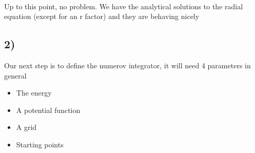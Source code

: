 \documentclass[10pt]{article}
\providecommand{\tightlist}{%
      \setlength{\itemsep}{0pt}\setlength{\parskip}{0pt}}
\begin{document}
    \begin{center}
    \end{center}
    { \hspace*{\fill} \\}

    Up to this point, no problem. We have the analytical solutions to the
radial equation (except for an r factor) and they are behaving nicely

    \subsection{2)}\label{section}

    Our next step is to define the numerov integrator, it will need 4
parameters in general

\begin{itemize}
\tightlist
\item
  The energy
\item
  A potential function
\item
  A grid
\item
  Starting points
\end{itemize}
\end{document}
